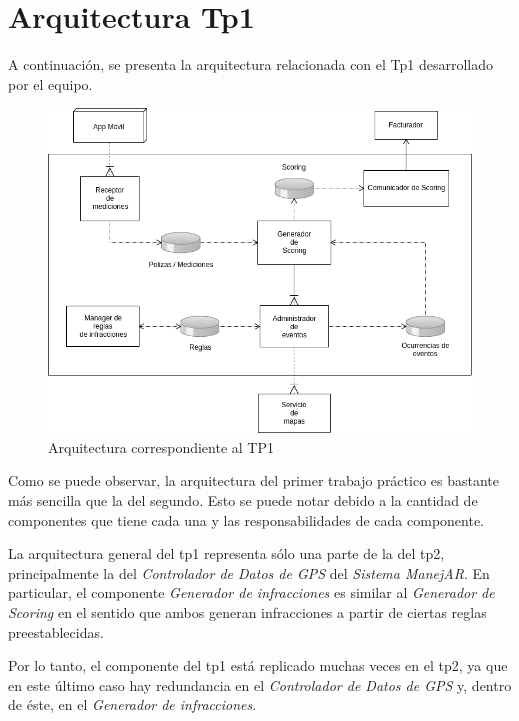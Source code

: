 \section{Arquitectura Tp1}

A continuación, se presenta la arquitectura relacionada con el Tp1 desarrollado por el equipo.

\begin{figure}
\centerline{\includegraphics[width=1\textwidth]{./imagenes/tp1.png}}
\caption{Arquitectura correspondiente al TP1}
\end{figure}

Como se puede observar, la arquitectura del primer trabajo práctico es bastante más sencilla
que la del segundo. Esto se puede notar debido a la cantidad de componentes que tiene cada una y
las responsabilidades de cada componente.


La arquitectura general del tp1 representa sólo una parte de la del tp2, principalmente la del
\textit{Controlador de Datos de GPS} del \textit{Sistema ManejAR}. 
En particular, el componente \textit{Generador de infracciones} es similar al \textit{Generador de Scoring} en el
sentido que ambos generan infracciones a partir de ciertas reglas preestablecidas.


Por lo tanto, el componente del tp1 está replicado muchas veces en el tp2, ya que en este último caso
hay redundancia en el \textit{Controlador de Datos de GPS} y, dentro de éste, en el \textit{Generador de infracciones}.






